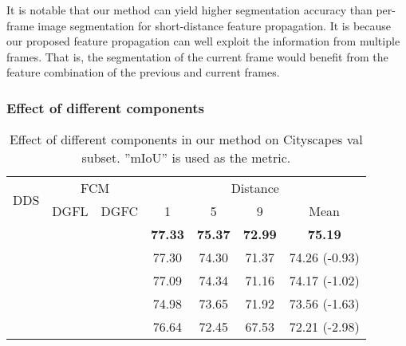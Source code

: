 \documentclass[journal]{IEEEtran}
\begin{document}
It is notable that our method can yield higher segmentation accuracy than per-frame image segmentation for short-distance feature propagation. It is because our proposed feature propagation can well exploit the information from multiple frames. That is, the segmentation of the current frame would benefit from the feature combination of the previous and current frames. 

\subsubsection{Effect of different components}

\begin{table}[t]
	\caption{Effect of different components in our method on Cityscapes val subset. ''mIoU'' is used as the metric.}
	\begin{center}
		\renewcommand{\arraystretch}{1.3}
		\begin{tabular}{c|c|c|c|c|c|c}
			\hline
			\multirow{2}{*}{DDS} & \multicolumn{2}{c|}{FCM} & \multicolumn{4}{c}{Distance} 							\\
			\cline{2-7}
			& DGFL		& DGFC      & 1			& 5				& 9 			& Mean   	 						\\
			\hline
			 	& 	& 	& \bf{77.33}	& \bf{75.37}	& \bf{72.99}	& \bf{75.19} 		\\
			& 	& 	& 77.30		& 74.30			& 71.37			& 74.26	(-0.93)						\\
			 	& 			& 	& 77.09			& 74.34			& 71.16			& 74.17	(-1.02)		\\
			 	& 	& 			& 74.98			& 73.65			& 71.92			& 73.56	(-1.63)		\\
			 	& 			& 			& 76.64			& 72.45 		& 67.53 		& 72.21	(-2.98)		\\
			\hline
		\end{tabular}
	\end{center}
	\label{exp_distortion}
\end{table}
\end{document}
